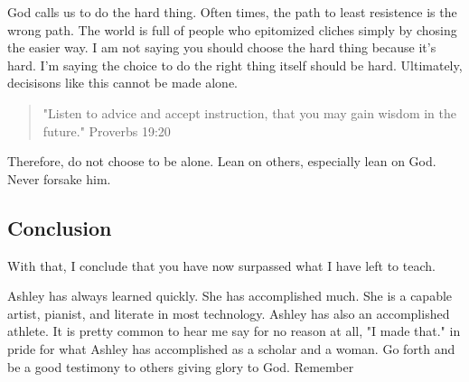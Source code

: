 \documentclass[11pt,a4paper,sans]{article}
\begin{document}
God calls us to do the hard thing. Often times, the path to least resistence
is the wrong path. The world is full of people who epitomized cliches simply by 
chosing the easier way. I am not saying you should choose the hard thing because it's
hard. I'm saying the choice to do the right thing itself should be hard. Ultimately,
decisisons like this cannot be made alone.

\begin{quote}
    "Listen to advice and accept instruction,
that you may gain wisdom in the future." Proverbs 19:20
\end{quote}

Therefore, do not choose to be alone. Lean on others, especially lean on God. 
Never forsake him.

\subsection{Conclusion}

With that, I conclude that you have now surpassed what I have left to teach. 

Ashley has always learned quickly. She has accomplished much. She is a capable artist,
pianist, and literate in most technology. Ashley has also an accomplished athlete.
It is pretty common to hear me say for no reason at all, "I made that." in pride for 
what Ashley has accomplished as a scholar and a woman. Go forth
and be a good testimony to others giving glory to God. Remember
\end{document}
